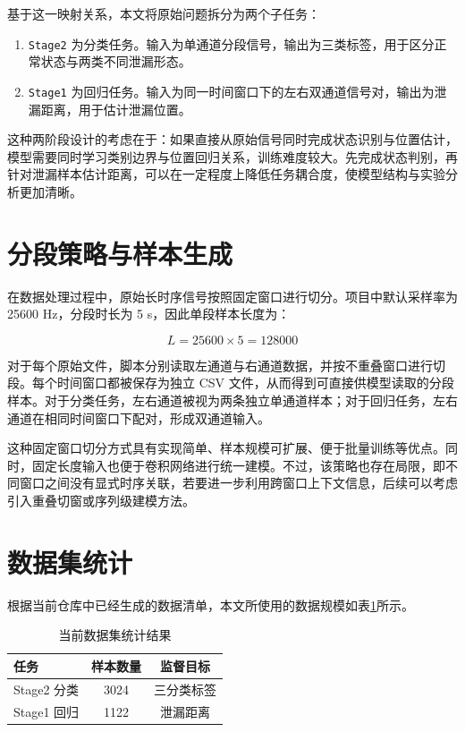 基于这一映射关系，本文将原始问题拆分为两个子任务：

\begin{enumerate}
  \item \texttt{Stage2} 为分类任务。输入为单通道分段信号，输出为三类标签，用于区分正常状态与两类不同泄漏形态。
  \item \texttt{Stage1} 为回归任务。输入为同一时间窗口下的左右双通道信号对，输出为泄漏距离，用于估计泄漏位置。
\end{enumerate}

这种两阶段设计的考虑在于：如果直接从原始信号同时完成状态识别与位置估计，模型需要同时学习类别边界与位置回归关系，训练难度较大。先完成状态判别，再针对泄漏样本估计距离，可以在一定程度上降低任务耦合度，使模型结构与实验分析更加清晰。

\section{分段策略与样本生成}

在数据处理过程中，原始长时序信号按照固定窗口进行切分。项目中默认采样率为 25600 Hz，分段时长为 5 s，因此单段样本长度为：

\begin{equation}
L = 25600 \times 5 = 128000
\end{equation}

对于每个原始文件，脚本分别读取左通道与右通道数据，并按不重叠窗口进行切段。每个时间窗口都被保存为独立 CSV 文件，从而得到可直接供模型读取的分段样本。对于分类任务，左右通道被视为两条独立单通道样本；对于回归任务，左右通道在相同时间窗口下配对，形成双通道输入。

这种固定窗口切分方式具有实现简单、样本规模可扩展、便于批量训练等优点。同时，固定长度输入也便于卷积网络进行统一建模。不过，该策略也存在局限，即不同窗口之间没有显式时序关联，若要进一步利用跨窗口上下文信息，后续可以考虑引入重叠切窗或序列级建模方法。

\section{数据集统计}

根据当前仓库中已经生成的数据清单，本文所使用的数据规模如表\ref{tab:dataset_stats}所示。

\begin{table}[!htbp]
  \centering
  \caption{当前数据集统计结果}
  \label{tab:dataset_stats}
  \vspace{0.5em}
  \begin{tabular}{lcc}
    \toprule
    任务 & 样本数量 & 监督目标 \\
    \midrule
    Stage2 分类 & 3024 & 三分类标签 \\
    Stage1 回归 & 1122 & 泄漏距离 \\
    \bottomrule
  \end{tabular}
\end{table}

